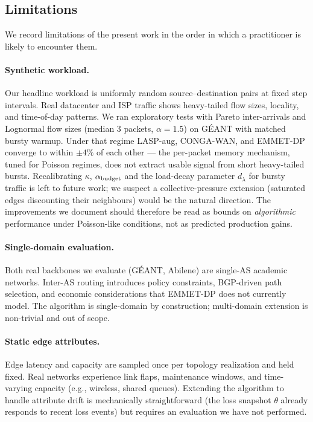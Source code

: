 \subsection{Limitations}
\label{subsec:limitations}

We record limitations of the present work in the order in which a
practitioner is likely to encounter them.

\paragraph{Synthetic workload.}
Our headline workload is uniformly random source--destination
pairs at fixed step intervals. Real datacenter and ISP traffic
shows heavy-tailed flow sizes, locality, and time-of-day patterns.
We ran exploratory tests with Pareto inter-arrivals and Lognormal
flow sizes (median 3 packets, $\alpha=1.5$) on GÉANT with
matched bursty warmup. Under that regime LASP-aug, CONGA-WAN,
and EMMET-DP converge to within $\pm 4\%$ of each other --- the
per-packet memory mechanism, tuned for Poisson regimes, does
not extract usable signal from short heavy-tailed bursts.
Recalibrating $\kappa$, $\alpha_{\rm budget}$ and the load-decay
parameter $d_\lambda$ for bursty traffic is left to future work;
we suspect a collective-pressure extension (saturated edges
discounting their neighbours) would be the natural direction.
The improvements we document should therefore be read as bounds
on \emph{algorithmic} performance under Poisson-like conditions,
not as predicted production gains.

\paragraph{Single-domain evaluation.}
Both real backbones we evaluate (GÉANT, Abilene) are
single-AS academic networks. Inter-AS routing introduces policy
constraints, BGP-driven path selection, and economic
considerations that EMMET-DP does not currently model. The
algorithm is single-domain by construction; multi-domain
extension is non-trivial and out of scope.

\paragraph{Static edge attributes.}
Edge latency and capacity are sampled once per topology
realization and held fixed. Real networks experience link flaps,
maintenance windows, and time-varying capacity (e.g., wireless,
shared queues). Extending the algorithm to handle attribute drift
is mechanically straightforward (the loss snapshot $\theta$
already responds to recent loss events) but requires an
evaluation we have not performed.

